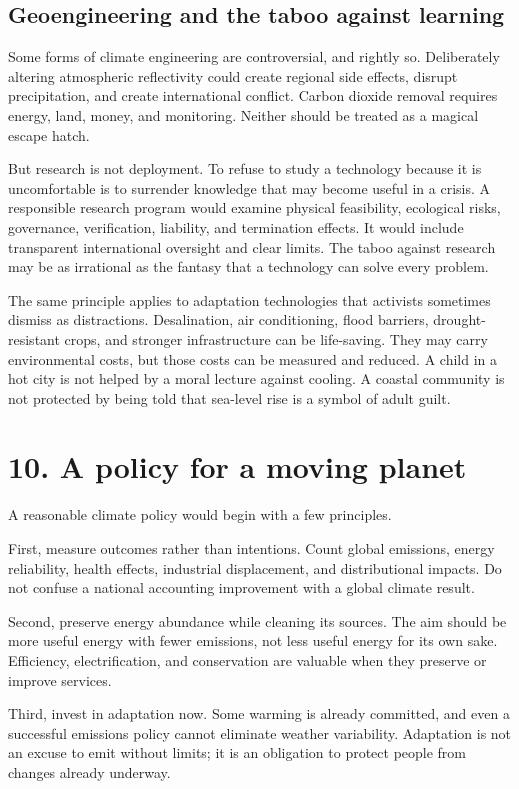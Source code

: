 ﻿\documentclass[12pt,a4paper]{book}
\begin{document}
\subsection{Geoengineering and the taboo against learning}
Some forms of climate engineering are controversial, and rightly so. Deliberately altering atmospheric reflectivity could create regional side effects, disrupt precipitation, and create international conflict. Carbon dioxide removal requires energy, land, money, and monitoring. Neither should be treated as a magical escape hatch.

But research is not deployment. To refuse to study a technology because it is uncomfortable is to surrender knowledge that may become useful in a crisis. A responsible research program would examine physical feasibility, ecological risks, governance, verification, liability, and termination effects. It would include transparent international oversight and clear limits. The taboo against research may be as irrational as the fantasy that a technology can solve every problem.

The same principle applies to adaptation technologies that activists sometimes dismiss as distractions. Desalination, air conditioning, flood barriers, drought-resistant crops, and stronger infrastructure can be life-saving. They may carry environmental costs, but those costs can be measured and reduced. A child in a hot city is not helped by a moral lecture against cooling. A coastal community is not protected by being told that sea-level rise is a symbol of adult guilt.

\section{10. A policy for a moving planet}
A reasonable climate policy would begin with a few principles.

First, measure outcomes rather than intentions. Count global emissions, energy reliability, health effects, industrial displacement, and distributional impacts. Do not confuse a national accounting improvement with a global climate result.

Second, preserve energy abundance while cleaning its sources. The aim should be more useful energy with fewer emissions, not less useful energy for its own sake. Efficiency, electrification, and conservation are valuable when they preserve or improve services.

Third, invest in adaptation now. Some warming is already committed, and even a successful emissions policy cannot eliminate weather variability. Adaptation is not an excuse to emit without limits; it is an obligation to protect people from changes already underway.
\end{document}
